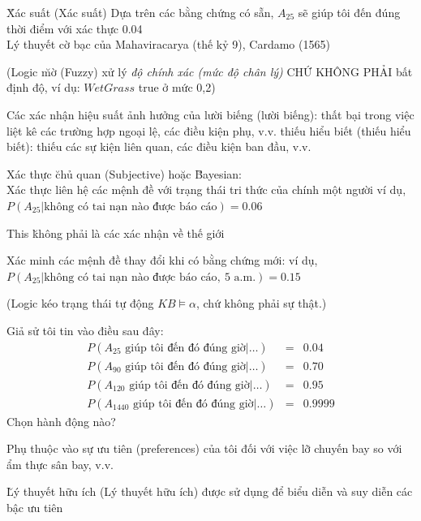\documentclass[fleqn]{article}
\begin{document}
\begin{huge}
\u{Xác suất (Xác suất)}\al
  Dựa trên các bằng chứng có sẵn,\nl
    $A_{25}$ sẽ giúp tôi đến đúng thời điểm với xác thực 0.04\\
Lý thuyết cờ bạc của Mahaviracarya (thế kỷ 9), Cardamo (1565)

(Logic \u{mờ (Fuzzy)} xử lý {\em độ chính xác (mức độ chân lý)} CHỨ KHÔNG PHẢI bất định độ, ví dụ:\al
  $WetGrass$ true ở mức 0,2)




Các xác nhận hiệu suất ảnh hưởng của 
  \u{ lười biếng (lười biếng)}: thất bại trong việc liệt kê các trường hợp ngoại lệ, các điều kiện phụ, v.v.\al
  \u{ thiếu hiểu biết (thiếu hiểu biết)}: thiếu các sự kiện liên quan, các điều kiện ban đầu, v.v.

Xác thực \u{chủ quan (Subjective)} hoặc \u{Bayesian}:\\
Xác thực liên hệ các mệnh đề với trạng thái tri thức của chính một người\nl
ví dụ, $P(A_{25} | \mbox{không có tai nạn nào được báo cáo}) = 0.06$

This \u{không} phải là các xác nhận về thế giới

Xác minh các mệnh đề thay đổi khi có bằng chứng mới:\nl
ví dụ, $P(A_{25} | \mbox{không có tai nạn nào được báo cáo},\ \mbox{5 a.m.}) = 0.15$

(Logic kéo trạng thái tự động $KB \models \alpha$, chứ không phải sự thật.)




Giả sử tôi tin vào điều sau đây:
\begin{eqnarray*}
P(A_{25}\mbox{ giúp tôi đến đó đúng giờ} | \ldots) &=& 0.04 \\
P(A_{90}\mbox{ giúp tôi đến đó đúng giờ} | \ldots) &=& 0.70 \\
P(A_{120}\mbox{ giúp tôi đến đó đúng giờ} | \ldots) &=& 0.95 \\
P(A_{1440}\mbox{ giúp tôi đến đó đúng giờ} | \ldots) &=& 0.9999 
\end{eqnarray*}
Chọn hành động nào?

Phụ thuộc vào \u{ sự ưu tiên (preferences)} của tôi đối với việc lỡ chuyến bay so với ẩm thực sân bay, v.v.

\u{Lý thuyết hữu ích (Lý thuyết hữu ích)} được sử dụng để biểu diễn và suy diễn các bậc ưu tiên


\end{huge}
\end{document}

